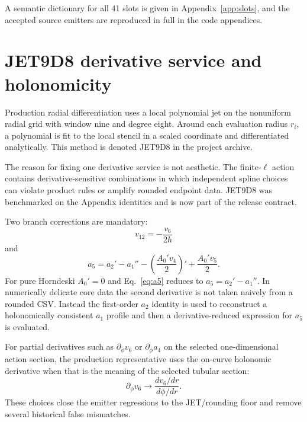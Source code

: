 \documentclass[11pt,a4paper,oneside]{book}
\begin{document}
A semantic dictionary for all 41 slots is given in Appendix~\ref{app:slots}, and the accepted source emitters are reproduced in full in the code appendices.

\chapter{JET9D8 derivative service and holonomicity}
Production radial differentiation uses a local polynomial jet on the nonuniform radial grid with window nine and degree eight. Around each evaluation radius $r_i$, a polynomial is fit to the local stencil in a scaled coordinate and differentiated analytically. This method is denoted JET9D8 in the project archive.

The reason for fixing one derivative service is not aesthetic. The finite-$\ell$ action contains derivative-sensitive combinations in which independent spline choices can violate product rules or amplify rounded endpoint data. JET9D8 was benchmarked on the Appendix identities and is now part of the release contract.

Two branch corrections are mandatory:
\begin{equation}
 \boxed{v_{12}=-\frac{v_6}{2h}}
\end{equation}
and
\begin{equation}
 \boxed{a_5=a_2'-a_1''-\left(\frac{A_0'v_4}{2}\right)'+\frac{A_0'v_5}{2}.}
 \label{eq:a5}
\end{equation}
For pure Horndeski $A_0'=0$ and Eq.~\eqref{eq:a5} reduces to $a_5=a_2'-a_1''$. In numerically delicate core data the second derivative is not taken naively from a rounded CSV. Instead the first-order $a_2$ identity is used to reconstruct a holonomically consistent $a_1$ profile and then a derivative-reduced expression for $a_5$ is evaluated.

For partial derivatives such as $\partial_\phi v_6$ or $\partial_\phi a_4$ on the selected one-dimensional action section, the production representative uses the on-curve holonomic derivative when that is the meaning of the selected tubular section:
\begin{equation}
 \partial_\phi v_6\to\frac{dv_6/dr}{d\phi/dr}.
\end{equation}
These choices close the emitter regressions to the JET/rounding floor and remove several historical false mismatches.
\end{document}
